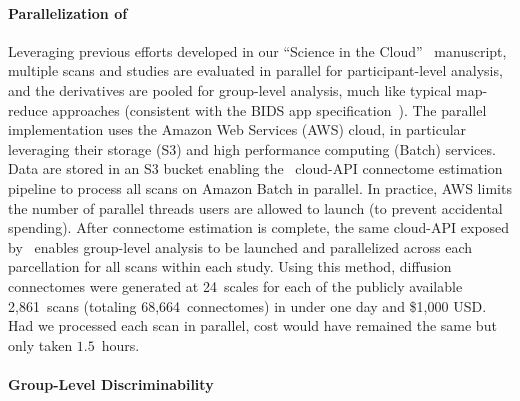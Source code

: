 \documentclass[11pt]{article}
\begin{document}
\begin{multicols}{2}


\paragraph{Parallelization of \ndmg}

Leveraging previous efforts developed in our  ``Science in the Cloud''~\cite{sic} manuscript, multiple scans and studies are evaluated in parallel for participant-level analysis, and the derivatives are pooled for group-level analysis, much like typical map-reduce approaches (consistent with the BIDS app specification~\cite{bidsapps}).
The parallel  implementation uses the Amazon Web Services (AWS) cloud, in particular leveraging their storage (S3) and high performance computing (Batch) services.
Data are stored in an S3 bucket enabling  the \ndmg~cloud-API connectome estimation pipeline to process all scans on Amazon Batch in parallel.
In practice,  AWS limits the number of parallel threads users are allowed to launch (to prevent accidental spending).
After connectome estimation is complete, the same cloud-API exposed by \ndmg~enables group-level analysis to be launched and parallelized across each parcellation for all scans within each study.
Using this method, diffusion connectomes were generated at 24~scales for each of the publicly available 2,861~scans (totaling 68,664~connectomes) in under one day and \$1,000 USD.
Had we processed each scan in parallel, cost would have remained the same but only taken $1.5$~hours.

\paragraph{Group-Level Discriminability}
\label{sec:disc}


\end{multicols}
\end{document}
